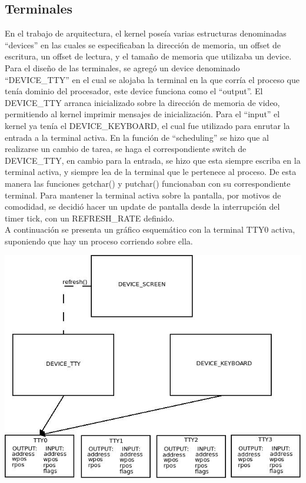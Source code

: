 \documentclass[a4paper,10pt]{article}
\begin{document}
\subsection{Terminales}
En el trabajo de arquitectura, el kernel poseía varias estructuras denominadas ``devices'' en las cuales se 
especificaban la dirección de memoria, un offset de escritura, un offset de lectura, y el tamaño de memoria que
utilizaba un device. Para el diseño de las terminales, se agregó un device denominado ``DEVICE\_TTY'' en el cual
se alojaba la terminal en la que corría el proceso que tenía dominio del procesador, este device funciona como el
``output''. El DEVICE\_TTY arranca inicializado sobre la dirección de memoria de video, permitiendo
al kernel imprimir mensajes de inicialización. Para el ``input'' el kernel ya tenía el DEVICE\_KEYBOARD, el cual fue utilizado
para enrutar la entrada a la terminal activa. En la función de ``scheduling'' se hizo que al realizarse un cambio de tarea,
se haga el correspondiente switch de DEVICE\_TTY, en cambio para la entrada, se hizo que esta siempre escriba en la terminal
activa, y siempre lea de la terminal que le pertenece al proceso. De esta manera las funciones getchar() y putchar() funcionaban
con su correspondiente terminal. Para mantener la terminal activa sobre la pantalla, por motivos de comodidad, se decidió hacer
un update de pantalla desde la interrupción del timer tick, con un REFRESH\_RATE definido.\\
\noindent A continuación se presenta un gráfico esquemático con la terminal TTY0 activa, suponiendo que hay un proceso corriendo sobre ella.

\begin{center}
 \includegraphics[scale=0.45]{./terminales.jpeg}
\end{center}
\end{document}
